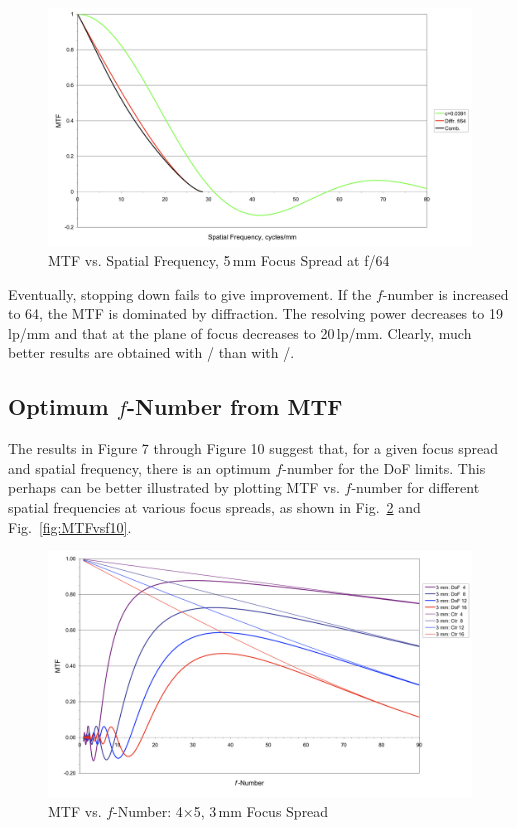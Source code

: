 \documentclass[11pt, oneside]{scrartcl}   	%
\newcommand{\f}[1]{\mbox{\raisebox{2pt}{\footnotesize $f$\hspace{-1.2pt}}/\hspace{-0.6pt}\raisebox{-0.6pt}{\small #1}}}
\begin{document}
\begin{figure}[htbp] %
   \centering
   \includegraphics[width=\linewidth]{figure/fig_dofd_10} 
   \caption{MTF vs. Spatial Frequency, 5\,mm Focus Spread at f/64}
   \label{fig:MTFvssf64}
\end{figure}
Eventually, stopping down fails to give improvement. If the $f$-number is increased to 64, the
MTF is dominated by diffraction. The resolving power decreases to 19\,lp/mm and that at the 
plane of focus decreases to 20\,lp/mm. Clearly, much better results are obtained with \f{45} than with \f{64}.
\subsection{Optimum $f$-Number from MTF}

The results in Figure 7 through Figure 10 suggest that, for a given focus spread and spatial frequency, there is an optimum $f$-number for the DoF limits. This perhaps can be better illustrated by plotting MTF vs. $f$-number for different spatial frequencies at various focus spreads, as shown in Fig.~\ref{fig:MTFvsf3} and Fig.~\ref{fig:MTFvsf10}.
\begin{figure}[htbp] %
   \centering
   \includegraphics[width=\linewidth]{figure/fig_dofd_11} 
   \caption{MTF vs. $f$-Number: 4×5, 3\,mm Focus Spread}
   \label{fig:MTFvsf3}
\end{figure}
\end{document}
